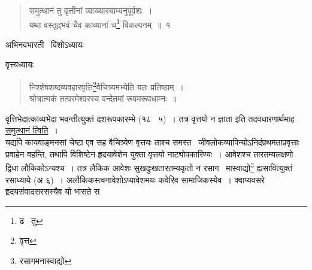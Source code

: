 \documentclass[11pt, openany]{book}
\begin{document}
\begin{quote}
{\na समुत्थानं तु वृत्तीनां व्याख्यास्याम्यनुपूर्वशः~।\\
यथा वस्तूद्भवं चैव काव्यानां च\renewcommand{\thefootnote}{2}\footnote{ढ \textendash\ तु} विकल्पनम्~॥~१}
\end{quote}

\begin{center}
अभिनवभारती \textendash\ विंशोऽध्यायः

वृत्त्यध्यायः
\end{center}

\begin{quote}
{\qt निश्शेषशब्दव्यवहारवृत्ति\renewcommand{\thefootnote}{1}\footnote{वृत्त}वैचित्र्यमभ्येति यतः प्रतिष्ठाम्~।\\
श्रोत्रात्मकं तत्परमेश्वरस्य वन्देतमां रूपमरूपधाम्नः~॥}
\end{quote}

वृत्तिभेदात्काव्यभेदा भवन्तीत्युक्तं दशरूपकारम्भे (१८ \textendash\ ५)~। तत्र वृत्तयो न ज्ञाता इति तदवधारणार्थमाह \underline{समुत्थानं त्विति}~।\\

यद्यपि कायवाङ्मनसां चेष्टा एव सह वैचित्र्येण वृत्तयः ताश्च समस्त \textendash\ जीवलोकव्यापिन्योऽनिदंप्रथमताप्रवृत्ताः प्रवाहेन वहन्ति, तथापि विशिष्टेन हृदयावेशेन युक्ता वृत्तयो नाट्योपकारिण्यः~। आवेशश्च तारतम्यलक्षणो द्विधा लौकिकोऽन्यश्च~। तत्र लैकिक आवेशः सुखदुःखतारतम्यकृतो न रसाग \textendash\ मास्वाद्यो\renewcommand{\thefootnote}{2}\footnote{रसागमनास्वाद्यो} ह्यसावित्युक्तं रसाध्याये (अ ६)~। अलौकिकस्त्वनावेशोऽप्यावेशमयः कवेरिव सामाजिकस्येव~। क्वाप्यवसरे हृदयसंवादसरसस्यैव यो भासते स

\newpage
\end{document}
